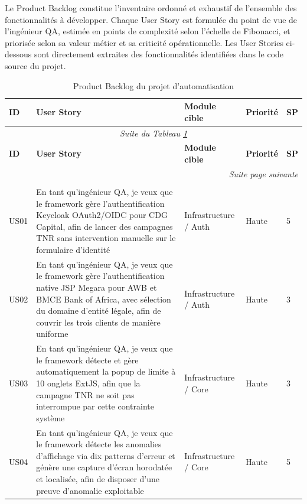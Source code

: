 \documentclass[12pt, a4paper]{report}
\begin{document}
Le Product Backlog constitue l'inventaire ordonné et exhaustif de l'ensemble des fonctionnalités à développer. Chaque User Story est formulée du point de vue de l'ingénieur QA, estimée en points de complexité selon l'échelle de Fibonacci, et priorisée selon sa valeur métier et sa criticité opérationnelle. Les User Stories ci-dessous sont directement extraites des fonctionnalités identifiées dans le code source du projet.

\begin{longtable}{p{0.9cm} p{6.0cm} p{2.6cm} p{1.5cm} p{0.9cm}}
\caption{Product Backlog du projet d'automatisation} \label{tab:backlog} \\
\toprule
\textbf{ID} & \textbf{User Story} & \textbf{Module cible} & \textbf{Priorité} & \textbf{SP} \\
\midrule
\endfirsthead
\multicolumn{5}{c}{\small\itshape Suite du Tableau \ref{tab:backlog}} \\[4pt]
\toprule
\textbf{ID} & \textbf{User Story} & \textbf{Module cible} & \textbf{Priorité} & \textbf{SP} \\
\midrule
\endhead
\midrule
\multicolumn{5}{r}{\small\itshape Suite page suivante} \\
\endfoot
\bottomrule
\multicolumn{5}{r}{\small SP = Story Points (Fibonacci)} \\
\endlastfoot

US01 & En tant qu'ingénieur QA, je veux que le framework gère l'authentification Keycloak OAuth2/OIDC pour CDG Capital, afin de lancer des campagnes TNR sans intervention manuelle sur le formulaire d'identité
      & Infrastructure / Auth & Haute & 5 \\[4pt]

US02 & En tant qu'ingénieur QA, je veux que le framework gère l'authentification native JSP Megara pour AWB et BMCE Bank of Africa, avec sélection du domaine d'entité légale, afin de couvrir les trois clients de manière uniforme
      & Infrastructure / Auth & Haute & 3 \\[4pt]

US03 & En tant qu'ingénieur QA, je veux que le framework détecte et gère automatiquement la popup de limite à 10 onglets ExtJS, afin que la campagne TNR ne soit pas interrompue par cette contrainte système
      & Infrastructure / Core & Haute & 3 \\[4pt]

US04 & En tant qu'ingénieur QA, je veux que le framework détecte les anomalies d'affichage via dix patterns d'erreur et génère une capture d'écran horodatée et localisée, afin de disposer d'une preuve d'anomalie exploitable
      & Infrastructure / Core & Haute & 5 \\[4pt]


\end{longtable}
\end{document}
